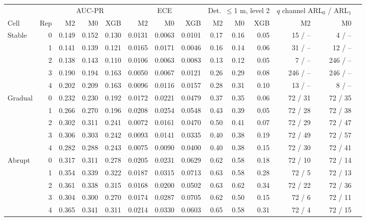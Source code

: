 {\scriptsize
\begin{tabular}{lrrrrrrrrrrrrr}
\toprule
 & & \multicolumn{3}{c}{AUC-PR} & \multicolumn{3}{c}{ECE} & \multicolumn{3}{c}{Det.\ $\le$1 m, level 2} & \multicolumn{2}{c}{$q$ channel ARL$_0$ / ARL$_1$} \\
\cmidrule(lr){3-5}\cmidrule(lr){6-8}\cmidrule(lr){9-11}\cmidrule(lr){12-13}
Cell & Rep & M2 & M0 & XGB & M2 & M0 & XGB & M2 & M0 & XGB & M2 & M0 \\
\midrule
Stable & 0 & 0.149 & 0.152 & 0.130 & 0.0131 & 0.0063 & 0.0101 & 0.17 & 0.16 & 0.05 & 15 / -- & 4 / -- \\
 & 1 & 0.141 & 0.139 & 0.121 & 0.0165 & 0.0171 & 0.0046 & 0.16 & 0.14 & 0.06 & 31 / -- & 12 / -- \\
 & 2 & 0.138 & 0.143 & 0.110 & 0.0106 & 0.0063 & 0.0083 & 0.13 & 0.12 & 0.05 & 7 / -- & 246 / -- \\
 & 3 & 0.190 & 0.194 & 0.163 & 0.0050 & 0.0067 & 0.0121 & 0.26 & 0.29 & 0.08 & 246 / -- & 246 / -- \\
 & 4 & 0.202 & 0.209 & 0.163 & 0.0096 & 0.0116 & 0.0157 & 0.28 & 0.31 & 0.10 & 13 / -- & 8 / -- \\
\addlinespace
Gradual & 0 & 0.232 & 0.230 & 0.192 & 0.0172 & 0.0221 & 0.0479 & 0.37 & 0.35 & 0.06 & 72 / 31 & 72 / 35 \\
 & 1 & 0.266 & 0.270 & 0.196 & 0.0208 & 0.0254 & 0.0548 & 0.43 & 0.39 & 0.05 & 72 / 28 & 72 / 38 \\
 & 2 & 0.302 & 0.311 & 0.241 & 0.0072 & 0.0161 & 0.0470 & 0.50 & 0.41 & 0.07 & 72 / 29 & 72 / 47 \\
 & 3 & 0.306 & 0.303 & 0.242 & 0.0093 & 0.0141 & 0.0335 & 0.40 & 0.38 & 0.19 & 72 / 49 & 72 / 57 \\
 & 4 & 0.282 & 0.288 & 0.243 & 0.0075 & 0.0090 & 0.0400 & 0.40 & 0.38 & 0.15 & 72 / 30 & 72 / 41 \\
\addlinespace
Abrupt & 0 & 0.317 & 0.311 & 0.278 & 0.0205 & 0.0231 & 0.0629 & 0.62 & 0.58 & 0.18 & 72 / 10 & 72 / 14 \\
 & 1 & 0.354 & 0.339 & 0.322 & 0.0187 & 0.0315 & 0.0713 & 0.63 & 0.58 & 0.28 & 72 / 5 & 72 / 13 \\
 & 2 & 0.361 & 0.338 & 0.315 & 0.0168 & 0.0200 & 0.0502 & 0.63 & 0.62 & 0.34 & 72 / 22 & 72 / 36 \\
 & 3 & 0.304 & 0.300 & 0.270 & 0.0174 & 0.0287 & 0.0705 & 0.62 & 0.50 & 0.15 & 72 / 6 & 72 / 11 \\
 & 4 & 0.365 & 0.341 & 0.311 & 0.0214 & 0.0330 & 0.0603 & 0.65 & 0.58 & 0.31 & 72 / 4 & 72 / 15 \\
\bottomrule
\end{tabular}}

